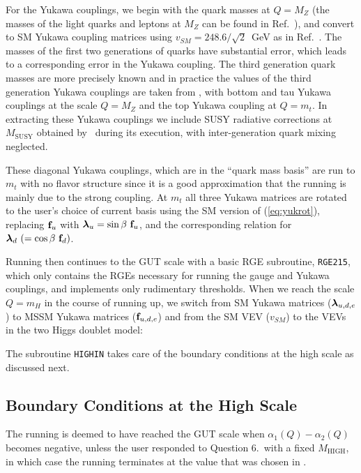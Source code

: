 For the Yukawa couplings, we begin with the quark masses at $Q=M_{Z}$
(the masses of the light quarks and leptons at $M_{Z}$ can be found in
Ref.~\cite{fusaoka}), and convert to SM Yukawa coupling matrices using
$v_{SM}=248.6/\sqrt{2}$~GeV as in Ref.~\cite{pierce}. The masses of the
first two generations of quarks have substantial error, which leads to a
corresponding error in the Yukawa coupling. The third generation quark
masses are more precisely known and in practice the values of the third
generation Yukawa couplings are taken from
\progisasug, with bottom and tau Yukawa couplings at the scale $Q=M_{Z}$
and the top Yukawa coupling at $Q=m_{t}$. In extracting these Yukawa
couplings we include SUSY radiative corrections
\cite{pierce} at $M_{\mathrm{SUSY}}$ obtained by \progisasug~during its
execution, with inter-generation quark mixing neglected.

These diagonal Yukawa couplings, which are in the ``quark mass basis''
are run to $m_{t}$ with no flavor structure since it is a good
approximation that the running is mainly due to the strong coupling. At
$m_{t}$ all three Yukawa matrices are rotated to the user's choice of
current basis using the SM version of (\ref{eq:yukrot}), replacing
${\mathbf{f}}_u$ with $\mbox{\boldmath$\lambda$}_u=\sin{\beta}\
{\mathbf{f}}_u$, and the corresponding relation for $\mbox{\boldmath$\lambda$}_{d}\ (=\cos{\beta}\
{\mathbf{f}}_d)$.

Running then continues to the GUT scale with a basic RGE subroutine,
\texttt{RGE215}, which only contains the RGEs necessary for running the
gauge and Yukawa couplings, and implements only rudimentary thresholds.
When we reach the scale $Q=m_{H}$ in the course of running up, we switch
from SM Yukawa matrices ($\mbox{\boldmath$\lambda$}_{u,d,e}$) to MSSM Yukawa matrices
(${\mathbf{f}}_{u,d,e}$) and from the SM VEV ($v_{SM}$) to the VEVs in the two
Higgs doublet model:  %

The subroutine \texttt{HIGHIN} takes care of the boundary conditions at
the high scale as discussed next.

\subsection{Boundary Conditions at the High Scale}\label{sec:gutins}

The running is deemed to have reached the GUT scale when
$\alpha_{1}(Q)-\alpha_{2}(Q)$ becomes negative, unless the user
responded to Question 6.~with a fixed $M_{\mathrm{HIGH}}$, in which case
the running terminates at the value that was chosen in \inrge.

